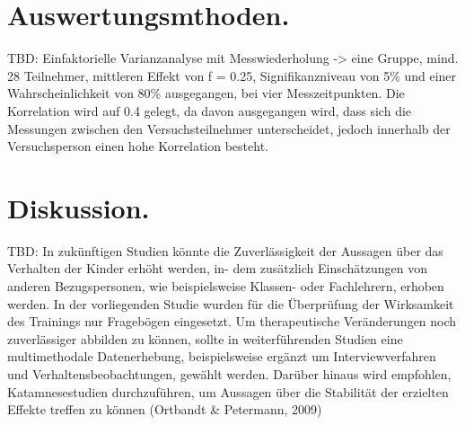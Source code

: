 \section{Auswertungsmthoden.} TBD: Einfaktorielle Varianzanalyse mit Messwiederholung -> eine Gruppe, mind. 28 Teilnehmer, mittleren Effekt von f = 0.25, Signifikanzniveau von 5\% und einer Wahrscheinlichkeit von 80\% ausgegangen, bei vier Messzeitpunkten. Die Korrelation wird auf 0.4 gelegt, da davon ausgegangen wird, dass sich die Messungen zwischen den Versuchsteilnehmer unterscheidet, jedoch innerhalb der Versuchsperson einen hohe Korrelation besteht.

\section{Diskussion.} TBD: In zukünftigen Studien könnte die Zuverlässigkeit der Aussagen über das Verhalten der Kinder erhöht werden, in- dem zusätzlich Einschätzungen von anderen Bezugspersonen, wie beispielsweise Klassen- oder Fachlehrern, erhoben werden. In der vorliegenden Studie wurden für die Überprüfung der Wirksamkeit des Trainings nur Fragebögen eingesetzt. Um therapeutische Veränderungen noch zuverlässiger abbilden zu können, sollte in weiterführenden Studien eine multimethodale Datenerhebung, beispielsweise ergänzt um Interviewverfahren und Verhaltensbeobachtungen, gewählt werden. Darüber hinaus wird empfohlen, Katamnesestudien durchzuführen, um Aussagen über die Stabilität der erzielten Effekte treffen zu können (Ortbandt \& Petermann, 2009)